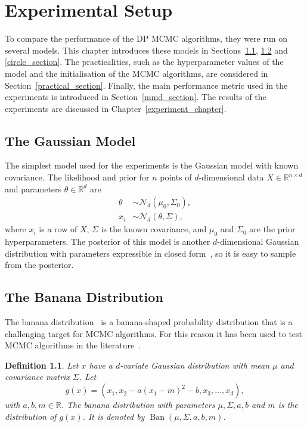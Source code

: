 \documentclass[english,twoside,openright]{HYgraduMLDS}
\newtheorem{definition}{Definition}
\newcommand{\R}{\mathbb{R}}
\newcommand{\caln}{{\mathcal{N}}}
\DeclareMathOperator{\ban}{Ban}
\begin{document}
\chapter{Experimental Setup}\label{experiment_setup_chapter}

To compare the performance of the DP MCMC algorithms, they were run on
several models. This chapter introduces these models in Sections~\ref{gauss_model},
\ref{banana_section} and \ref{circle_section}. The practicalities, such as
the hyperparameter values of the model and the initialisation of the
MCMC algorithms, are considered in Section~\ref{practical_section}.
Finally, the main performance
metric used in the experiments is introduced in Section~\ref{mmd_section}.
The results of the experiments are discussed in Chapter~\ref{experiment_chapter}.

\section{The Gaussian Model}\label{gauss_model}

The simplest model used for the experiments is the Gaussian model with
known covariance. The likelihood and prior for \(n\) points of \(d\)-dimensional
data \(X \in \R^{n\times d}\) and parameters \(\theta\in \R^{d}\) are
\begin{align*}
  \theta &\sim \caln_{d}(\mu_{0}, \Sigma_{0}), \\
  x_{i} &\sim \caln_{d}(\theta, \Sigma),
\end{align*}
where \(x_{i}\) is a row of \(X\), \(\Sigma\) is the known covariance,
and \(\mu_{0}\) and \(\Sigma_{0}\) are the prior hyperparameters.
The posterior of this model is another \(d\)-dimensional Gaussian distribution
with parameters expressible in closed form~\cite[Section 3.5]{BDA},
so it is easy to sample from the posterior.

\section{The Banana Distribution}\label{banana_section}

The banana distribution~\cite{TPK14} is a banana-shaped probability
distribution that is a challenging target for MCMC algorithms. For this reason it has
been used to test MCMC algorithms in the literature~\cite{TPK14}.

\begin{definition}
    Let \(x\) have a \(d\)-variate Gaussian distribution with
    mean \(\mu\) and covariance matrix \(\Sigma\). Let
    \[
        g(x) = (x_1, x_2 - a(x_1 - m)^2 - b, x_3, \dotsc, x_d),
    \]
    with \(a, b, m \in \R\).
    The banana distribution with parameters \(\mu, \Sigma, a, b\) and \(m\)
    is the distribution of \(g(x)\). It is denoted by
    \(\ban(\mu, \Sigma, a, b, m)\).
\end{definition}
\end{document}
